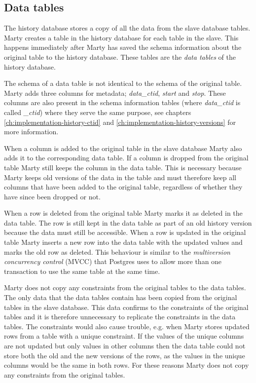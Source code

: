 \subsection{Data tables}
\label{ch:implementation-history-data}
The history database stores a copy of all the data from the slave database tables.
Marty creates a table in the history database for each table in the slave.
This happens immediately after Marty has saved the schema information about the original table to the history database.
These tables are the \textit{data tables} of the history database.

The schema of a data table is not identical to the schema of the original table.
Marty adds three columns for metadata; \textit{data\_ctid}, \textit{start} and \textit{stop}.
These columns are also present in the schema information tables (where \textit{data\_ctid} is called \textit{\_ctid}) where they serve the same purpose, see chapters \ref{ch:implementation-history-ctid} and \ref{ch:implementation-history-versions} for more information.

When a column is added to the original table in the slave database Marty also adds it to the corresponding data table.
If a column is dropped from the original table Marty still keeps the column in the data table.
This is necessary because Marty keeps old versions of the data in the table and must therefore keep all columns that have been added to the original table, regardless of whether they have since been dropped or not.

When a row is deleted from the original table Marty marks it as deleted in the data table.
The row is still kept in the data table as part of an old history version because the data must still be accessible.
When a row is updated in the original table Marty inserts a new row into the data table with the updated values and marks the old row as deleted.
This behaviour is similar to the \textit{multiversion concurrency control} (MVCC) that Postgres uses to allow more than one transaction to use the same table at the same time.

Marty does not copy any constraints from the original tables to the data tables.
The only data that the data tables contain has been copied from the original tables in the slave database.
This data confirms to the constraints of the original tables and it is therefore unnecessary to replicate the constraints in the data tables.
The constraints would also cause trouble, e.g. when Marty stores updated rows from a table with a unique constraint.
If the values of the unique columns are not updated but only values in other columns then the data table could not store both the old and the new versions of the rows, as the values in the unique columns would be the same in both rows.
For these reasons Marty does not copy any constraints from the original tables.

